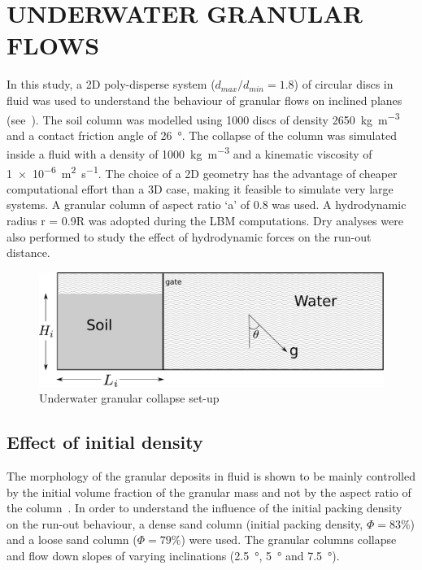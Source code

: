 \documentclass[12pt,a4paper,twocolumn,fleqn]{NARMS}
\begin{document}
\section{UNDERWATER GRANULAR FLOWS}
In this study, a 2D poly-disperse system ($d_{max}/d_{min} = 1.8$) of circular discs in fluid was used to understand the behaviour of granular flows on inclined planes (see~). The soil column was modelled using 1000 discs of density \SI{2650}{\kg\per\cubic\meter} and a contact friction angle of \SI{26}{\degree}. The collapse of the column was simulated inside a fluid with a density of \SI{1000}{\kg\per\cubic\meter}  and a kinematic viscosity of \SI{1e-6}{\square\meter\per\second}. The choice of a 2D geometry has the advantage of cheaper computational effort than a 3D case, making it feasible to simulate very large systems. A granular column of aspect ratio `a' of 0.8 was used. A hydrodynamic radius r = 0.9R was adopted during the LBM computations. Dry analyses were also performed to study the effect of hydrodynamic forces on the run-out distance.

\begin{figure}[htpb]
\includegraphics[width=0.97\columnwidth]{figs/geometry.pdf}
\caption{Underwater granular collapse set-up}
\label{fig:setup}
\end{figure}

\subsection{Effect of initial density}
The morphology of the granular deposits in fluid is shown to be mainly controlled by the initial volume fraction of the granular mass and not by the aspect ratio of the column~. In order to understand the influence of the initial packing density on the run-out behaviour, a dense sand column (initial packing density, $\Phi=83\%$) and a loose sand column ($\Phi=79\%$) were used. The granular columns collapse and flow down slopes of varying inclinations (\SI{2.5}{\degree}, \SI{5}{\degree} and \SI{7.5}{\degree}).
\end{document}
